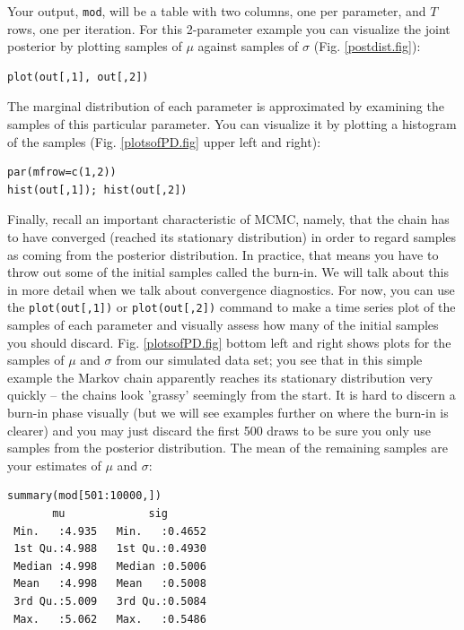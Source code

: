 Your output, \verb#mod#, will be a table with two columns, one per
parameter, and $T$ rows, one per iteration. For this 2-parameter example
you can visualize the joint posterior by plotting samples of $\mu$
against samples of $\sigma$ (Fig. \ref{postdist.fig}):
\begin{verbatim}
plot(out[,1], out[,2])
\end{verbatim}
The marginal distribution of each parameter is approximated by
examining the samples of this particular parameter. You can visualize
it by plotting a histogram of the samples (Fig. \ref{plotsofPD.fig} upper left and right):
\begin{verbatim}
par(mfrow=c(1,2))
hist(out[,1]); hist(out[,2])
\end{verbatim}

Finally, recall an important characteristic of MCMC, namely,
that the chain has to have converged (reached its stationary
distribution) in order to regard samples as coming from the posterior distribution. In
practice, that means you have to throw out some of the initial samples
called the burn-in. We will talk about this in more detail when we talk
about convergence diagnostics. For now, you can use the
\verb#plot(out[,1])# or \verb#plot(out[,2])# command to make a time
series plot of the samples of each parameter and visually assess how
many of the initial samples you should discard. Fig. \ref{plotsofPD.fig} bottom left and right shows
plots for the samples of $\mu$ and $\sigma$ from our simulated data set;
you see that in this simple example the Markov chain apparently
reaches its stationary distribution very quickly -- the chains look
'grassy' seemingly from the start. It is hard to discern a burn-in
phase visually (but we will see examples further on where the burn-in
is clearer) and you may just discard the first 500 draws to be sure
you only use samples from the posterior distribution. The mean of the
remaining samples are your estimates of $\mu$ and $\sigma$:
\begin{verbatim}
summary(mod[501:10000,])
       mu             sig
 Min.   :4.935   Min.   :0.4652
 1st Qu.:4.988   1st Qu.:0.4930
 Median :4.998   Median :0.5006
 Mean   :4.998   Mean   :0.5008
 3rd Qu.:5.009   3rd Qu.:0.5084
 Max.   :5.062   Max.   :0.5486
\end{verbatim}

